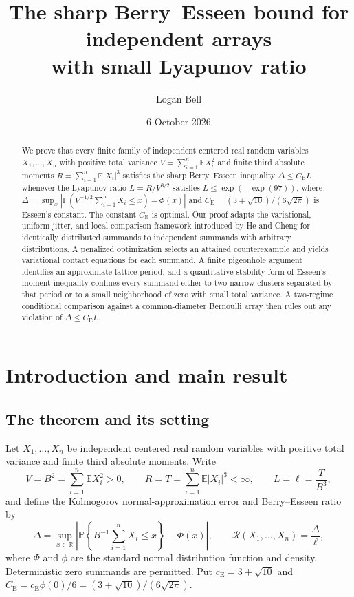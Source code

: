 \documentclass[11pt]{article}
\title{The sharp Berry--Esseen bound for independent arrays\\
with small Lyapunov ratio}
\author{Logan Bell}
\date{6 October 2026}
\numberwithin{equation}{section}
\theoremstyle{remark}
\newcommand{\E}{\mathbb E}
\newcommand{\Pp}{\mathbb P}
\newcommand{\R}{\mathbb R}
\newcommand{\be}{C_{\mathrm E}}
\newcommand{\ce}{c_{\mathrm E}}
\newcommand{\phz}{\phi(0)}
\begin{document}
\maketitle
\begin{abstract}
We prove that every finite family of independent centered real random
variables $X_1,\ldots,X_n$ with positive total variance $V=\sum_{i=1}^n\E X_i^2$
and finite third absolute moments $R=\sum_{i=1}^n\E|X_i|^3$ satisfies the
sharp Berry--Esseen inequality $\Delta\le\be L$ whenever the Lyapunov ratio
$L=R/V^{3/2}$ satisfies $L\le\exp(-\exp(97))$, where
$\Delta=\sup_x|\Pp(V^{-1/2}\sum_{i=1}^nX_i\le x)-\Phi(x)|$ and
$\be=(3+\sqrt{10})/(6\sqrt{2\pi})$ is Esseen's constant. The constant $\be$
is optimal. Our proof adapts the variational, uniform-jitter, and
local-comparison framework introduced by He and Cheng for identically
distributed summands to independent summands with arbitrary distributions.
A penalized optimization selects an attained counterexample and yields
variational contact equations for each summand. A finite pigeonhole argument
identifies an approximate lattice period, and a quantitative stability form
of Esseen's moment inequality confines every summand either to two narrow
clusters separated by that period or to a small neighborhood of zero with
small total variance. A two-regime conditional comparison against a
common-diameter Bernoulli array then rules out any violation of
$\Delta\le\be L$.
\end{abstract}
\tableofcontents

\section{Introduction and main result}\label{sec:theorem}

\subsection{The theorem and its setting}

Let $X_1,\ldots,X_n$ be independent centered real random variables with
positive total variance and finite third absolute moments. Write
\begin{equation}\label{eq:basic-data}
 V=B^2=\sum_{i=1}^n\E X_i^2>0,\qquad R=T=\sum_{i=1}^n\E|X_i|^3<\infty,
 \qquad L=\ell=\frac{T}{B^3},
\end{equation}
and define the Kolmogorov normal-approximation error and Berry--Esseen ratio
by
\[
 \Delta=\sup_{x\in\R}\left|\Pp\left\{B^{-1}\sum_{i=1}^nX_i\le x\right\}-\Phi(x)\right|,
 \qquad\mathcal R(X_1,\ldots,X_n)=\frac{\Delta}{\ell},
\]
where $\Phi$ and $\phi$ are the standard normal distribution function and
density. Deterministic zero summands are permitted. Put $\ce=3+\sqrt{10}$
and $\be=\ce\phz/6=(3+\sqrt{10})/(6\sqrt{2\pi})$.
\end{document}
